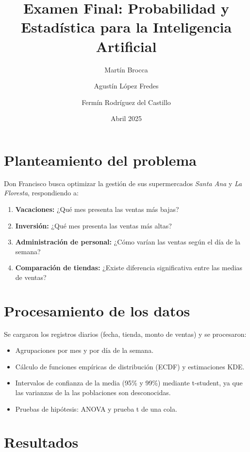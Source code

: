 \documentclass[12pt,a4paper]{article}
\title{Examen Final: Probabilidad y Estadística para la Inteligencia Artificial}
\author{Martín Brocca \and Agustín López Fredes \and Fermín Rodríguez del Castillo}
\date{Abril 2025}
\begin{document}
\maketitle

\section{Planteamiento del problema}
Don Francisco busca optimizar la gestión de sus supermercados \emph{Santa Ana} y \emph{La Floresta}, respondiendo a:
\begin{enumerate}
  \item \textbf{Vacaciones:} ¿Qué mes presenta las ventas más bajas?  
  \item \textbf{Inversión:} ¿Qué mes presenta las ventas más altas?  
  \item \textbf{Administración de personal:} ¿Cómo varían las ventas según el día de la semana?  
  \item \textbf{Comparación de tiendas:} ¿Existe diferencia significativa entre las medias de ventas?  
\end{enumerate}

\section{Procesamiento de los datos}
Se cargaron los registros diarios (fecha, tienda, monto de ventas) y se procesaron:
\begin{itemize}
  \item Agrupaciones por mes y por día de la semana.  
  \item Cálculo de funciones empíricas de distribución (ECDF) y estimaciones KDE.  
  \item Intervalos de confianza de la media (95\% y 99\%) mediante t-student, ya que las varianzas de la las poblaciones son desconocidas.  
  \item Pruebas de hipótesis: ANOVA y prueba t de una cola.  
\end{itemize}

\section{Resultados}
\end{document}
